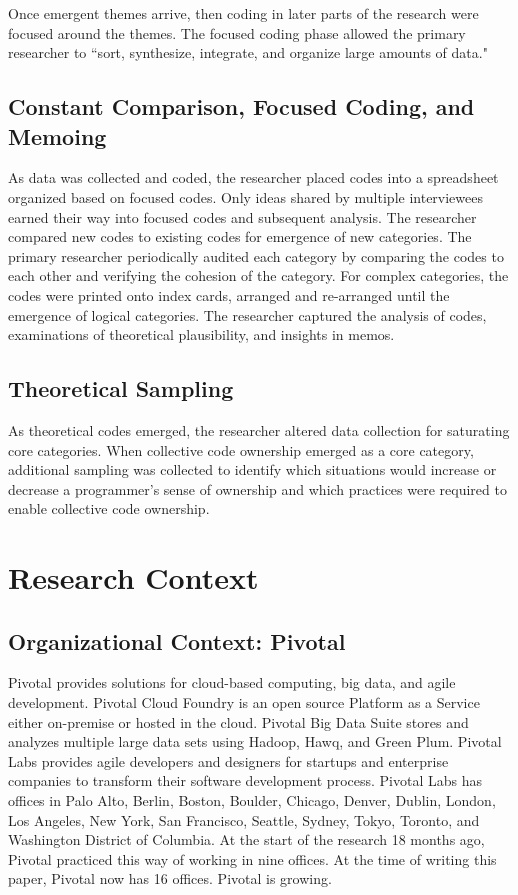 Once emergent themes arrive, then coding in later parts of the research were focused around the themes. The focused coding phase allowed the primary researcher to ``sort, synthesize, integrate, and organize large amounts of data."
\subsection{Constant Comparison, Focused Coding, and Memoing}
As data was collected and coded, the researcher placed codes into a spreadsheet organized based on focused codes. Only ideas shared by multiple interviewees earned their way into focused codes and subsequent analysis. The researcher compared new codes to existing codes for emergence of new categories. The primary researcher periodically audited each category by comparing the codes to each other and verifying the cohesion of the category. For complex categories, the codes were printed onto index cards, arranged and re-arranged until the emergence of logical categories.  The researcher captured the analysis of codes, examinations of theoretical plausibility, and insights in memos. 

\subsection{Theoretical Sampling}
As theoretical codes emerged, the researcher altered data collection for saturating core categories. When collective code ownership emerged as a core category, additional sampling was collected to identify which situations would increase or decrease a programmer's sense of ownership and which practices were required to enable collective code ownership.

\section{Research Context}
\label{ResearchContext}
\subsection{Organizational Context: Pivotal}
Pivotal provides solutions for cloud-based computing, big data, and agile development. Pivotal Cloud Foundry is an open source Platform as a Service either on-premise or hosted in the cloud. Pivotal Big Data Suite stores and analyzes multiple large data sets using Hadoop, Hawq, and Green Plum. Pivotal Labs provides agile developers and designers for startups and enterprise companies to transform their software development process. Pivotal Labs has offices in Palo Alto, Berlin, Boston, Boulder, Chicago, Denver, Dublin, London, Los Angeles, New York, San Francisco, Seattle, Sydney, Tokyo, Toronto, and Washington District of Columbia. At the start of the research 18 months ago, Pivotal practiced this way of working in nine offices. At the time of writing this paper, Pivotal now has 16 offices. Pivotal is growing.

